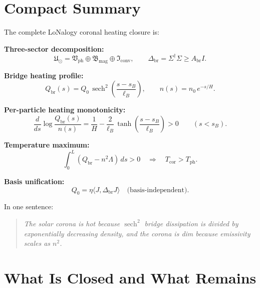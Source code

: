 \documentclass[12pt]{article}
\theoremstyle{plain}
\theoremstyle{definition}
\numberwithin{equation}{section}
\newcommand{\br}{\mathrm{br}}
\newcommand{\ph}{\mathrm{ph}}
\newcommand{\cor}{\mathrm{cor}}
\newcommand{\fU}{\mathfrak{U}}
\newcommand{\fI}{\mathfrak{I}}
\newcommand{\fV}{\mathfrak{V}}
\newcommand{\fB}{\mathfrak{B}}
\DeclareMathOperator{\sech}{sech}
\begin{document}
\section{Compact Summary}\label{sec:compact}

The complete LoNalogy coronal heating closure is:

\textbf{Three-sector decomposition:}
\begin{equation}
\fU_\odot = \fV_{\ph}\oplus\fB_{\mathrm{mag}}\oplus\fI_{\mathrm{conv}},
\qquad
\Delta_{\br}=\Sigma^\dagger\Sigma\geq A_{\br}I.
\end{equation}

\textbf{Bridge heating profile:}
\begin{equation}
Q_{\br}(s) = Q_0\,\sech^2\!\left(\frac{s-s_B}{\ell_B}\right),
\qquad n(s) = n_0\,e^{-s/H}.
\end{equation}

\textbf{Per-particle heating monotonicity:}
\begin{equation}
\frac{d}{ds}\log\frac{Q_{\br}(s)}{n(s)}
= \frac{1}{H}
- \frac{2}{\ell_B}\,\tanh\!\left(\frac{s-s_B}{\ell_B}\right)
> 0 \qquad(s<s_B).
\end{equation}

\textbf{Temperature maximum:}
\begin{equation}
\int_0^L(Q_{\br}-n^2\Lambda)\,ds > 0
\quad\Longrightarrow\quad
T_{\cor} > T_{\ph}.
\end{equation}

\textbf{Basis unification:}
\begin{equation}
Q_0 = \eta\langle J,\Delta_{\br}J\rangle
\quad\text{(basis-independent)}.
\end{equation}

In one sentence:
\begin{quote}
\emph{The solar corona is hot because $\sech^2$ bridge dissipation
is divided by exponentially decreasing density, and the corona is
dim because emissivity scales as $n^2$.}
\end{quote}


\section{What Is Closed and What Remains}\label{sec:status}
\end{document}
